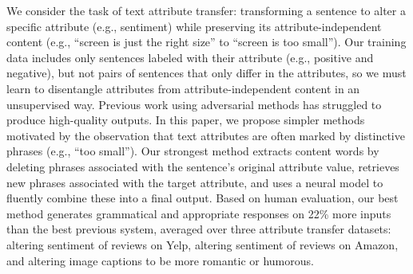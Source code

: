We consider the task of text attribute transfer: transforming a sentence to alter a specific attribute (e.g., sentiment) while preserving its attribute-independent content (e.g., ``screen is just the right size'' to ``screen is too small''). Our training data includes only sentences labeled with their attribute (e.g., positive and negative), but not pairs of sentences that only differ in the attributes, so we must learn to disentangle attributes from attribute-independent content in an unsupervised way. Previous work using adversarial methods has struggled to produce high-quality outputs. In this paper, we propose simpler methods motivated by the observation that text attributes are often marked by distinctive phrases (e.g., ``too small''). Our strongest method extracts content words by deleting phrases associated with the sentence's original attribute value, retrieves new phrases associated with the target attribute, and uses a neural model to fluently combine these into a final output. Based on human evaluation, our best method generates grammatical and appropriate responses on 22\% more inputs than the best previous system, averaged over three attribute transfer datasets: altering sentiment of reviews on Yelp, altering sentiment of reviews on Amazon, and altering image captions to be more romantic or humorous.
